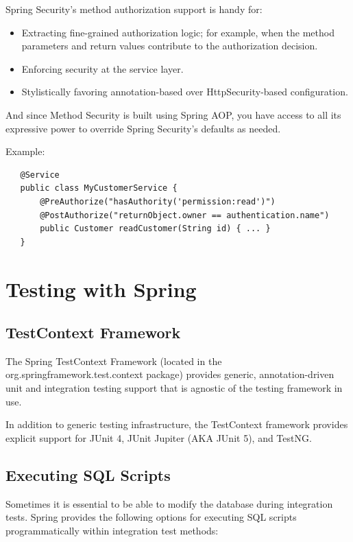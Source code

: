 \documentclass{scrartcl}
\begin{document}
Spring Security’s method authorization support is handy for:

\begin{itemize}
    \item Extracting fine-grained authorization logic; for example, when the method parameters and return values contribute to the authorization decision.
    \item Enforcing security at the service layer.
    \item Stylistically favoring annotation-based over HttpSecurity-based configuration.
\end{itemize}

And since Method Security is built using Spring AOP, you have access to all its expressive power to override Spring Security’s defaults as needed.

Example:

\begin{lstlisting}
   @Service
   public class MyCustomerService {
       @PreAuthorize("hasAuthority('permission:read')")
       @PostAuthorize("returnObject.owner == authentication.name")
       public Customer readCustomer(String id) { ... }
   }
\end{lstlisting}

\section{Testing with Spring}

\subsection{TestContext Framework}

The Spring TestContext Framework (located in the org.springframework.test.context package) provides generic, annotation-driven unit and integration testing support that is agnostic of the testing framework in use.

In addition to generic testing infrastructure, the TestContext framework provides explicit support for JUnit 4, JUnit Jupiter (AKA JUnit 5), and TestNG.

\subsection{Executing SQL Scripts}

Sometimes it is essential to be able to modify the database during integration tests.
Spring provides the following options for executing SQL scripts programmatically within integration test methods:
\end{document}
